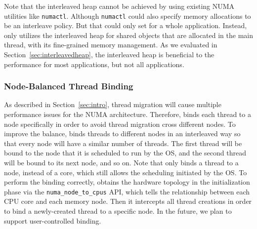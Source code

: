 Note that the interleaved heap cannot be achieved by using existing NUMA utilities like \texttt{numactl}. Although \texttt{numactl} could also specify memory allocations to be an interleave policy. But that could only set for a whole application. Instead, \NM{} only utilizes the interleaved heap for shared objects that are allocated in the main thread, with its fine-grained memory management. As we evaluated in Section~\ref{sec:interleavedheap}, the interleaved heap is beneficial to the performance for most applications, but not all applications.  
\subsubsection{Node-Balanced Thread Binding} 
As described in Section~\ref{sec:intro}, thread migration will cause multiple performance issues for the NUMA architecture. Therefore, \NM{} binds each thread to a node specifically in order to avoid thread migration cross different nodes. To improve the balance, \NM{} binds threads to different nodes in an interleaved way so that every node will have a similar number of threads. The first thread will be bound to the node that it is scheduled to run by the OS, and the second thread will be bound to its next node, and so on. Note that \NM{} only binds a thread to a node, instead of a core, which still allows the scheduling initiated by the OS. To perform the binding correctly, \NM{} obtains the hardware topology in the initialization phase via the \texttt{numa\_node\_to\_cpus} API, which tells the relationship between each CPU core and each memory node. Then it intercepts all thread creations in order to bind a newly-created thread to a specific node. In the future, we plan to support user-controlled binding.



  
